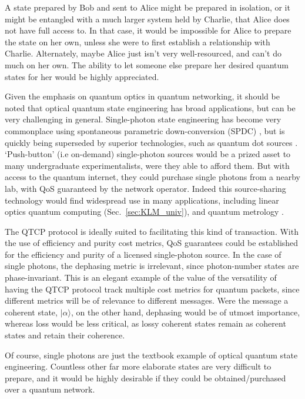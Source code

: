 \documentclass[aps,rmp,twocolumn,amsmath,amssymb,nofootinbib,superscriptaddress]{revtex4}
\newcommand{\ket}[1]{|#1\rangle}
\begin{document}
A state prepared by Bob and sent to Alice might be prepared in isolation, or it might be entangled with a much larger system held by Charlie, that Alice does not have full access to. In that case, it would be impossible for Alice to prepare the state on her own, unless she were to first establish a relationship with Charlie. Alternately, maybe Alice just isn't very well-resourced, and can't do much on her own. The ability to let someone else prepare her desired quantum states for her would be highly appreciated.

Given the emphasis on quantum optics in quantum networking, it should be noted that optical quantum state engineering has broad applications, but can be very challenging in general. Single-photon state engineering has become very commonplace using spontaneous parametric down-conversion (SPDC) \cite{???}, but is quickly being superseded by superior technologies, such as quantum dot sources \cite{???}. `Push-button' (i.e on-demand) single-photon sources would be a prized asset to many undergraduate experimentalists, were they able to afford them. But with access to the quantum internet, they could purchase single photons from a nearby lab, with QoS guaranteed by the network operator. Indeed this source-sharing technology would find widespread use in many applications, including linear optics quantum computing (Sec.~\ref{sec:KLM_univ}), and quantum metrology \cite{???, bib:MORDOR15}.

The QTCP protocol is ideally suited to facilitating this kind of transaction. With the use of efficiency and purity cost metrics, QoS guarantees could be established for the efficiency and purity of a licensed single-photon source. In the case of single photons, the dephasing metric is irrelevant, since photon-number states are phase-invariant. This is an elegant example of the value of the versatility of having the QTCP protocol track multiple cost metrics for quantum packets, since different metrics will be of relevance to different messages. Were the message a coherent state, $\ket\alpha$, on the other hand, dephasing would be of utmost importance, whereas loss would be less critical, as lossy coherent states remain as coherent states and retain their coherence.

Of course, single photons are just the textbook example of optical quantum state engineering. Countless other far more elaborate states are very difficult to prepare, and it would be highly desirable if they could be obtained/purchased over a quantum network.
\end{document}
